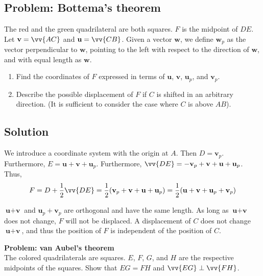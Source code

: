 \documentclass[english,oneside, hidelinks, 11 pt, class=report,crop=false]{standalone}
\begin{document}
\newpage
\subsection*{Problem: Bottema's theorem}

The red and the green quadrilateral are both squares. $F$ is the midpoint of $DE$. Let $\textbf{v}=\vv{AC}$ and $\textbf{u}=\vv{CB}$. Given a vector $\textbf{w}$, we define $\textbf{w}_p$ as the vector perpendicular to $\textbf{w}$, pointing to the left with respect to the direction of $\textbf{w}$, and with equal length as $\textbf{w}$.\os
\begin{enumerate}[label=\alph*)]
	\item Find the coordinates of $F$ expressed in terms of $\textbf{u}$, $\textbf{v}$, $\textbf{u}_p$, and $\textbf{v}_p$.
	\item Describe the possible displacement of $F$ if $C$ is shifted in an arbitrary direction. (It is sufficient to consider the case where $C$ is above $AB$).
\end{enumerate}

\subsection*{Solution}


We introduce a coordinate system with the origin at $A$. Then $D=\textbf{v}_p$. Furthermore, $E=\textbf{u}+\textbf{v}+\textbf{u}_p$. Furthermore, $\vv{DE}=-\textbf{v}_p+\textbf{v}+\textbf{u}+\textbf{u}_p$. Thus,
\[ F = D+\frac{1}{2}\vv{DE}=\frac{1}{2}(\textbf{v}_p+\textbf{v}+\textbf{u}+\textbf{u}_p)=\frac{1}{2}(\textbf{u}+\textbf{v}+\textbf{u}_p+\textbf{v}_p) \]

$\textbf{u}+\textbf{v}$ and $\textbf{u}_p+\textbf{v}_p$ are orthogonal and have the same length. As long as $\textbf{u}+\textbf{v}$ does not change, $F$ will not be displaced. A displacement of $C$ does not change $\textbf{u}+\textbf{v}$, and thus the position of $F$ is independent of the position of $C$.


\newpage
\textbf{Problem: van Aubel's theorem} \\
The colored quadrilaterals are squares. $E$, $F$, $G$, and $H$ are the respective midpoints of the squares. Show that $EG = FH$ and $\vv{EG} \perp \vv{FH}$.
\end{document}
